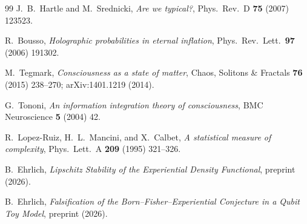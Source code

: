 \documentclass[11pt]{article}
\begin{document}
\begin{thebibliography}{99}
J.~B.~Hartle and M.~Srednicki,
\emph{Are we typical?},
Phys.\ Rev.\ D \textbf{75} (2007) 123523.

R.~Bousso,
\emph{Holographic probabilities in eternal inflation},
Phys.\ Rev.\ Lett.\ \textbf{97} (2006) 191302.

M.~Tegmark,
\emph{Consciousness as a state of matter},
Chaos, Solitons \& Fractals \textbf{76} (2015) 238--270;
arXiv:1401.1219 (2014).

G.~Tononi,
\emph{An information integration theory of consciousness},
BMC Neuroscience \textbf{5} (2004) 42.

R.~Lopez-Ruiz, H.~L.~Mancini, and X.~Calbet,
\emph{A statistical measure of complexity},
Phys.\ Lett.\ A \textbf{209} (1995) 321--326.

B.~Ehrlich,
\emph{Lipschitz Stability of the Experiential Density Functional},
preprint (2026).

B.~Ehrlich,
\emph{Falsification of the Born--Fisher--Experiential Conjecture in a
Qubit Toy Model},
preprint (2026).

\end{thebibliography}
\end{document}
